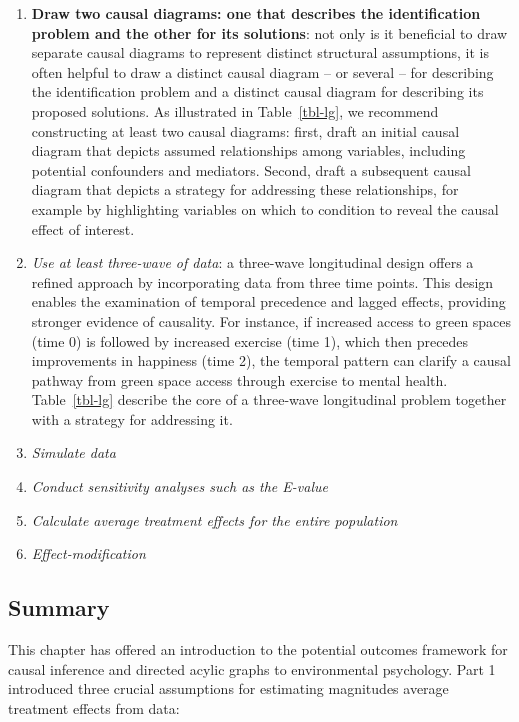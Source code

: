\documentclass[
  singlecolumn]{article}
\begin{document}
\begin{enumerate}
\def\labelenumi{\arabic{enumi}.}
\item
  \textbf{Draw two causal diagrams: one that describes the
  identification problem and the other for its solutions}: not only is
  it beneficial to draw separate causal diagrams to represent distinct
  structural assumptions, it is often helpful to draw a distinct causal
  diagram -- or several -- for describing the identification problem and
  a distinct causal diagram for describing its proposed solutions. As
  illustrated in Table~\ref{tbl-lg}, we recommend constructing at least
  two causal diagrams: first, draft an initial causal diagram that
  depicts assumed relationships among variables, including potential
  confounders and mediators. Second, draft a subsequent causal diagram
  that depicts a strategy for addressing these relationships, for
  example by highlighting variables on which to condition to reveal the
  causal effect of interest.
\item
  \emph{Use at least three-wave of data}: a three-wave longitudinal
  design offers a refined approach by incorporating data from three time
  points. This design enables the examination of temporal precedence and
  lagged effects, providing stronger evidence of causality. For
  instance, if increased access to green spaces (time 0) is followed by
  increased exercise (time 1), which then precedes improvements in
  happiness (time 2), the temporal pattern can clarify a causal pathway
  from green space access through exercise to mental health.
  Table~\ref{tbl-lg} describe the core of a three-wave longitudinal
  problem together with a strategy for addressing it.
\item
  \emph{Simulate data}
\item
  \emph{Conduct sensitivity analyses such as the E-value}
\item
  \emph{Calculate average treatment effects for the entire population}
\item
  \emph{Effect-modification}
\end{enumerate}

\subsection{Summary}\label{summary}

This chapter has offered an introduction to the potential outcomes
framework for causal inference and directed acylic graphs to
environmental psychology. Part 1 introduced three crucial assumptions
for estimating magnitudes average treatment effects from data:
\end{document}

